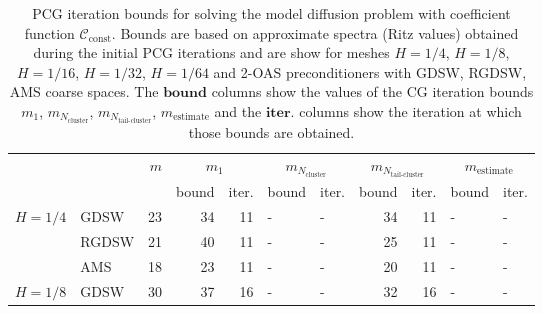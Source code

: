 \begin{table}[H]
\centering
\caption{PCG iteration bounds for solving the model diffusion problem with coefficient function $\mathcal{C}_{\mathrm{const}}$. Bounds are based on approximate spectra (Ritz values) obtained during the initial PCG iterations and are show for meshes $H=1/4$, $H=1/8$, $H=1/16$, $H=1/32$, $H=1/64$ and 2-OAS preconditioners with GDSW, RGDSW, AMS coarse spaces. The $\textbf{bound}$ columns show the values of the CG iteration bounds $m_1$, $m_{N_{\text{cluster}}}$, $m_{N_{\text{tail-cluster}}}$, $m_{\text{estimate}}$ and the $\textbf{iter.}$ columns show the iteration at which those bounds are obtained.}
\label{tab:cg_iteration_bound_coef=const}
\begin{tabular}{llrrrllrrll}
\toprule
 &  & \bfseries $m$ & \multicolumn{2}{|c|}{\bfseries $m_1$} & \multicolumn{2}{|c|}{\bfseries $m_{N_{\text{cluster}}}$} & \multicolumn{2}{|c|}{\bfseries $m_{N_{\text{tail-cluster}}}$} & \multicolumn{2}{|c|}{\bfseries $m_{\text{estimate}}$} \\
 &  &  & bound & iter. & bound & iter. & bound & iter. & bound & iter. \\
\midrule
\multirow[c]{3}{*}{\bfseries $H=1/4$} & GDSW & 23 & {\cellcolor[HTML]{004529}} \color[HTML]{F1F1F1} 34 & 11 & {\cellcolor[HTML]{BCE395}} \color[HTML]{000000} {\cellcolor[HTML]{ADD8E6}} - & - & {\cellcolor[HTML]{379E54}} \color[HTML]{F1F1F1} 34 & 11 & {\cellcolor[HTML]{FFFFE5}} \color[HTML]{000000} {\cellcolor[HTML]{ADD8E6}} - & - \\
\cline{2-11}
\bfseries  & RGDSW & 21 & {\cellcolor[HTML]{BCE395}} \color[HTML]{000000} 40 & 11 & {\cellcolor[HTML]{004529}} \color[HTML]{F1F1F1} {\cellcolor[HTML]{ADD8E6}} - & - & {\cellcolor[HTML]{379E54}} \color[HTML]{F1F1F1} 25 & 11 & {\cellcolor[HTML]{FFFFE5}} \color[HTML]{000000} {\cellcolor[HTML]{ADD8E6}} - & - \\
\cline{2-11}
\bfseries  & AMS & 18 & {\cellcolor[HTML]{BCE395}} \color[HTML]{000000} 23 & 11 & {\cellcolor[HTML]{004529}} \color[HTML]{F1F1F1} {\cellcolor[HTML]{ADD8E6}} - & - & {\cellcolor[HTML]{379E54}} \color[HTML]{F1F1F1} 20 & 11 & {\cellcolor[HTML]{FFFFE5}} \color[HTML]{000000} {\cellcolor[HTML]{ADD8E6}} - & - \\
\cline{1-11} \cline{2-11}
\multirow[c]{3}{*}{\bfseries $H=1/8$} & GDSW & 30 & {\cellcolor[HTML]{BCE395}} \color[HTML]{000000} 37 & 16 & {\cellcolor[HTML]{004529}} \color[HTML]{F1F1F1} {\cellcolor[HTML]{ADD8E6}} - & - & {\cellcolor[HTML]{379E54}} \color[HTML]{F1F1F1} 32 & 16 & {\cellcolor[HTML]{FFFFE5}} \color[HTML]{000000} {\cellcolor[HTML]{ADD8E6}} - & - \\

\end{tabular}
\end{table}

